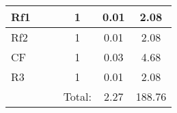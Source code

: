 \begin{table}[H]
\begin{tabular}{|l|l|l|c|c|c|}
\hline
Rf1                  &                      &                    & 1                           & 0.01                            & 2.08                                     \\ 
\hline
Rf2                  &                      &                    & 1                           & 0.01                            & 2.08                                     \\ 
\hline
CF                   &                      &                    & 1                           & 0.03                            & 4.68                                     \\ 
\hline
R3                   &                      &                    & 1                           & 0.01                            & 2.08                                     \\ 
\hline
\multicolumn{1}{l}{} & \multicolumn{1}{l}{} &                    & \multicolumn{1}{l|}{Total:} & 2.27                            & 188.76                                   \\
\cline{4-6}
\end{tabular}
\end{table}